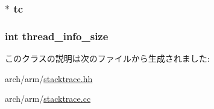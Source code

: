 \label{classArmISA_1_1ProcessInfo_a6bca839d8255baba5c53a5eace70d72e}
\hypertarget{classArmISA_1_1ProcessInfo_a4455a4759e69e5ebe68ae7298cbcc37d}{
\subsubsection[{tc}]{$\ast$ {\bf tc}}}
\label{classArmISA_1_1ProcessInfo_a4455a4759e69e5ebe68ae7298cbcc37d}
\hypertarget{classArmISA_1_1ProcessInfo_aa02520c2e86b94388e0d4f4a7b0873b3}{
\subsubsection[{thread\_\-info\_\-size}]{\setlength{\rightskip}{0pt plus 5cm}int {\bf thread\_\-info\_\-size}}}
\label{classArmISA_1_1ProcessInfo_aa02520c2e86b94388e0d4f4a7b0873b3}


このクラスの説明は次のファイルから生成されました:\begin{DoxyCompactItemize}
\item 
arch/arm/\hyperlink{arm_2stacktrace_8hh}{stacktrace.hh}\item 
arch/arm/\hyperlink{arm_2stacktrace_8cc}{stacktrace.cc}\end{DoxyCompactItemize}
